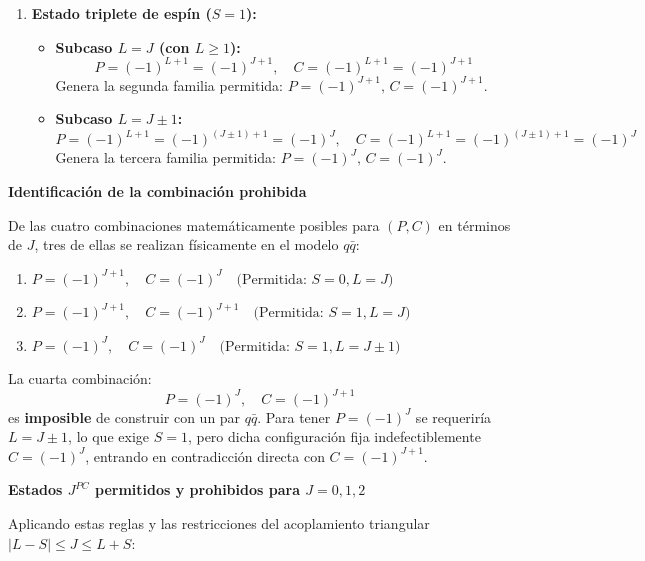 \begin{problema}
\begin{enumerate}[label=\arabic*.]
    \item \textbf{Estado triplete de espín ($S = 1$):}
    \begin{itemize}
        \item \textbf{Subcaso $L = J$ (con $L \ge 1$):}
        \begin{equation*}
            P = (-1)^{L+1} = (-1)^{J+1}, \quad C = (-1)^{L+1} = (-1)^{J+1}
        \end{equation*}
        Genera la segunda familia permitida: $P = (-1)^{J+1}, \, C = (-1)^{J+1}$.

        \item \textbf{Subcaso $L = J \pm 1$:}
        \begin{equation*}
            P = (-1)^{L+1} = (-1)^{(J \pm 1) + 1} = (-1)^J, \quad C = (-1)^{L+1} = (-1)^{(J \pm 1) + 1} = (-1)^J
        \end{equation*}
        Genera la tercera familia permitida: $P = (-1)^J, \, C = (-1)^J$.
    \end{itemize}
\end{enumerate}

\textbf{Identificación de la combinación prohibida}

De las cuatro combinaciones matemáticamente posibles para $(P, C)$ en términos de $J$, tres de ellas se realizan físicamente en el modelo $q\bar{q}$:
\begin{enumerate}[label=\roman*.]
    \item $P = (-1)^{J+1}, \quad C = (-1)^J \quad \text{(Permitida: } S=0, L=J\text{)}$
    \item $P = (-1)^{J+1}, \quad C = (-1)^{J+1} \quad \text{(Permitida: } S=1, L=J\text{)}$
    \item $P = (-1)^J, \quad C = (-1)^J \quad \text{(Permitida: } S=1, L=J \pm 1\text{)}$
\end{enumerate}

La cuarta combinación:
\begin{equation*}
    P = (-1)^J, \quad C = (-1)^{J+1}
\end{equation*}
es \textbf{imposible} de construir con un par $q\bar{q}$. Para tener $P = (-1)^J$ se requeriría $L = J \pm 1$, lo que exige $S = 1$, pero dicha configuración fija indefectiblemente $C = (-1)^J$, entrando en contradicción directa con $C = (-1)^{J+1}$.

\textbf{Estados $J^{PC}$ permitidos y prohibidos para $J=0, 1, 2$}

Aplicando estas reglas y las restricciones del acoplamiento triangular $|L-S| \le J \le L+S$:


\end{problema}
